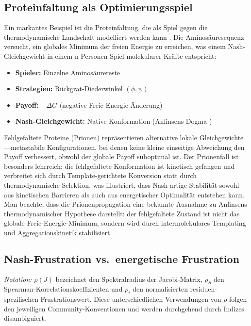 \documentclass[12pt,a4paper]{article}
\theoremstyle{remark}
\begin{document}
\subsection{Proteinfaltung als Optimierungsspiel}

Ein markantes Beispiel ist die Proteinfaltung, die als Spiel gegen die thermodynamische Landschaft modelliert werden kann \citep{EnzymeFolding}. Die Aminos\"auresequenz versucht, ein globales Minimum der freien Energie zu erreichen, was einem Nash-Gleichgewicht in einem n-Personen-Spiel molekularer Kr\"afte entspricht:

\begin{itemize}
    \item \textbf{Spieler:} Einzelne Aminos\"aurereste
    \item \textbf{Strategien:} R\"uckgrat-Diederwinkel $(\phi, \psi)$
    \item \textbf{Payoff:} $-\Delta G$ (negative Freie-Energie-\"Anderung)
    \item \textbf{Nash-Gleichgewicht:} Native Konformation (Anfinsens Dogma \citep{Anfinsen1973})
\end{itemize}

Fehlgefaltete Proteine (Prionen) repr\"asentieren alternative lokale Gleichgewichte---metastabile Konfigurationen, bei denen keine kleine einseitige Abweichung den Payoff verbessert, obwohl der globale Payoff suboptimal ist. Der Prionenfall ist besonders lehrreich: die fehlgefaltete Konformation ist kinetisch gefangen und verbreitet sich durch Template-gerichtete Konversion statt durch thermodynamische Selektion, was illustriert, dass Nash-artige Stabilit\"at sowohl aus kinetischen Barrieren als auch aus energetischer Optimalit\"at entstehen kann. Man beachte, dass die Prionenpropagation eine bekannte Ausnahme zu Anfinsens thermodynamischer Hypothese darstellt: der fehlgefaltete Zustand ist nicht das globale Freie-Energie-Minimum, sondern wird durch intermolekulares Templating und Aggregationskinetik stabilisiert.

\subsection{Nash-Frustration vs.\ energetische Frustration}

\noindent\textit{Notation:} $\rho(J)$ bezeichnet den Spektralradius der Jacobi-Matrix, $\rho_S$ den Spearman-Korrelationskoeffizienten und $\rho_i$ den normalisierten residuen-spezifischen Frustrationswert. Diese unterschiedlichen Verwendungen von $\rho$ folgen den jeweiligen Community-Konventionen und werden durchgehend durch Indizes disambiguiert.
\end{document}
